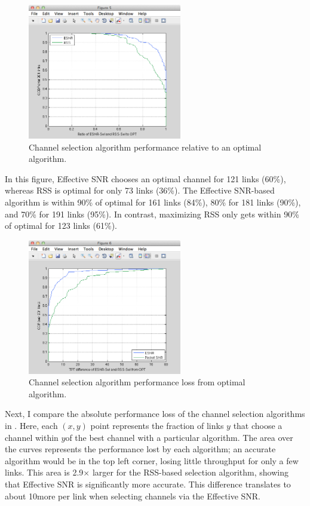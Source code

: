 \begin{figure}[htp]
	\centering
	\includegraphics[width=0.6\textwidth]{figures/esnr/chan_sel_ratio_opt.png}
	\caption{\label{fig:chan_sel_ratio_opt}Channel selection algorithm performance relative to an optimal algorithm.}
\end{figure}

In this figure, Effective SNR chooses an optimal channel for 121 links (60\%), whereas RSS is optimal for only 73 links (36\%). The Effective SNR-based algorithm is within 90\% of optimal for 161 links (84\%), 80\% for 181 links (90\%), and 70\% for 191 links (95\%). In contrast, maximizing RSS only gets within 90\% of optimal for 123 links (61\%).

\begin{figure}[htp]
	\centering
	\includegraphics[width=0.6\textwidth]{figures/esnr/chan_sel_delta_opt.png}
	\caption{\label{fig:chan_sel_delta_opt}Channel selection algorithm performance loss from optimal algorithm.}
\end{figure}

Next, I compare the absolute performance loss of the channel selection algorithms in . Here, each $(x,y)$ point represents the fraction of links $y$ that choose a channel within $y$\Mbps of the best channel with a particular algorithm. The area over the curves represents the performance lost by each algorithm; an accurate algorithm would be in the top left corner, losing little throughput for only a few links. This area is 2.9$\times$ larger for the RSS-based selection algorithm, showing that Effective SNR is significantly more accurate. This difference translates to about 10\Mbps more per link when selecting channels via the Effective SNR.


